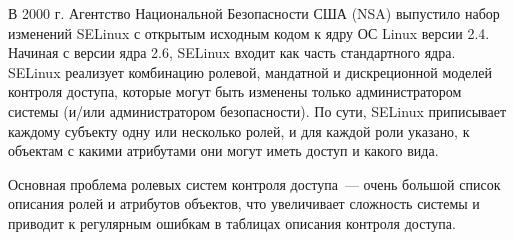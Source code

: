 В 2000 г. Агентство Национальной Безопасности США (NSA) выпустило набор изменений SELinux с открытым исходным кодом к ядру ОС Linux версии 2.4. Начиная с версии ядра 2.6, SELinux входит как часть стандартного ядра. SELinux реализует комбинацию ролевой, мандатной и дискреционной моделей контроля доступа, которые могут быть изменены только администратором системы (и/или администратором безопасности). По сути, SELinux приписывает каждому субъекту одну или несколько ролей, и для каждой роли указано, к объектам с какими атрибутами они могут иметь доступ и какого вида.

Основная проблема ролевых систем контроля доступа~--- очень большой список описания ролей и атрибутов объектов, что увеличивает сложность системы и приводит к регулярным ошибкам в таблицах описания контроля доступа.
